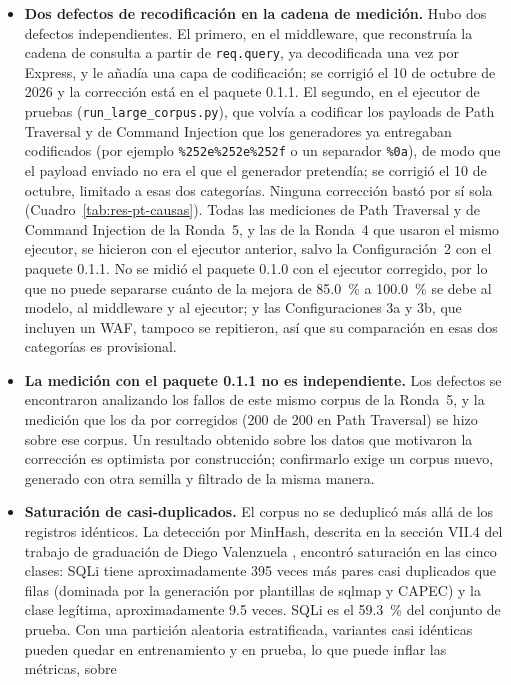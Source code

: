 \begin{itemize}
    \item \textbf{Dos defectos de recodificación en la cadena de medición.} Hubo dos defectos
    independientes. El primero, en el middleware, que reconstruía la cadena de consulta a partir de
    \texttt{req.query}, ya decodificada una vez por Express, y le añadía una capa de codificación;
    se corrigió el 10 de octubre de 2026 y la corrección está en el paquete 0.1.1. El segundo, en el
    ejecutor de pruebas (\texttt{run\_large\_corpus.py}), que volvía a codificar los payloads de
    Path Traversal y de Command Injection que los generadores ya entregaban codificados (por
    ejemplo \texttt{\%252e\%252e\%252f} o un separador \texttt{\%0a}), de modo que el payload enviado
    no era el que el generador pretendía; se corrigió el 10 de octubre, limitado a esas dos
    categorías. Ninguna corrección bastó por sí sola (Cuadro~\ref{tab:res-pt-causas}). Todas las
    mediciones de Path Traversal y de Command Injection de la Ronda~5, y las de la Ronda~4 que usaron
    el mismo ejecutor, se hicieron con el ejecutor anterior, salvo la Configuración~2 con el paquete
    0.1.1. No se midió el paquete 0.1.0 con el ejecutor corregido, por lo que no puede separarse
    cuánto de la mejora de 85.0~\% a 100.0~\% se debe al modelo, al middleware y al ejecutor; y las
    Configuraciones 3a y 3b, que incluyen un WAF, tampoco se repitieron, así que su comparación en
    esas dos categorías es provisional.
    \item \textbf{La medición con el paquete 0.1.1 no es independiente.} Los defectos se
    encontraron analizando los fallos de este mismo corpus de la Ronda~5, y la medición que los da
    por corregidos (200 de 200 en Path Traversal) se hizo sobre ese corpus. Un resultado obtenido
    sobre los datos que motivaron la corrección es optimista por construcción; confirmarlo exige un
    corpus nuevo, generado con otra semilla y filtrado de la misma manera.
    \item \textbf{Saturación de casi-duplicados.} El corpus no se deduplicó más allá de los
    registros idénticos. La detección por MinHash, descrita en la sección VII.4 del trabajo de
    graduación de Diego Valenzuela \cite{valenzuela2026ia}, encontró saturación en las cinco clases: SQLi tiene
    aproximadamente 395 veces más pares casi duplicados que filas (dominada por la generación por
    plantillas de sqlmap y CAPEC) y la clase legítima, aproximadamente 9.5 veces. SQLi es el
    59.3~\% del conjunto de prueba. Con una partición aleatoria estratificada, variantes casi
    idénticas pueden quedar en entrenamiento y en prueba, lo que puede inflar las métricas, sobre

\end{itemize}
